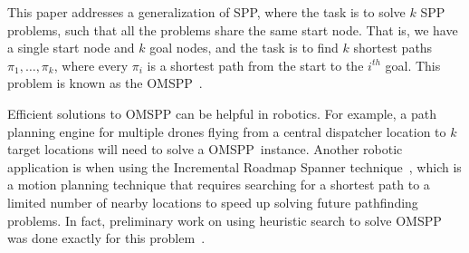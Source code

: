 \documentclass[smallextended]{svjour3}       %
\newcommand{\omspp}{\ac{OMSPP}\xspace}
\newcommand{\roni}[1]{\textbf{[RS:#1]}}
\begin{document}




This paper addresses a generalization of \ac{SPP}, where the task is to solve $k$ \ac{SPP} problems, such that all the problems share the same start node.
That is, we have a single start node and $k$ goal nodes, and the task is to find $k$ shortest paths $\pi_1,\ldots,\pi_k$, where every $\pi_i$ is a shortest path from the start to the $i^{th}$ goal. 
This problem is known as the \omspp~\cite{delling2011faster}. 


Efficient solutions to \omspp can be helpful in robotics. 
For example, a path planning engine for multiple drones flying from a central dispatcher location to $k$ target locations will need to solve a \omspp\ instance. 
Another robotic application is when using the Incremental Roadmap Spanner technique~\cite{marble2013asymptotically}, which is a motion planning technique that requires searching for a shortest path to a limited number of nearby locations to speed up solving future pathfinding problems.
In fact, preliminary work on using heuristic search to solve \omspp was done exactly for this problem~\cite{DobsonB14}.
\end{document}
